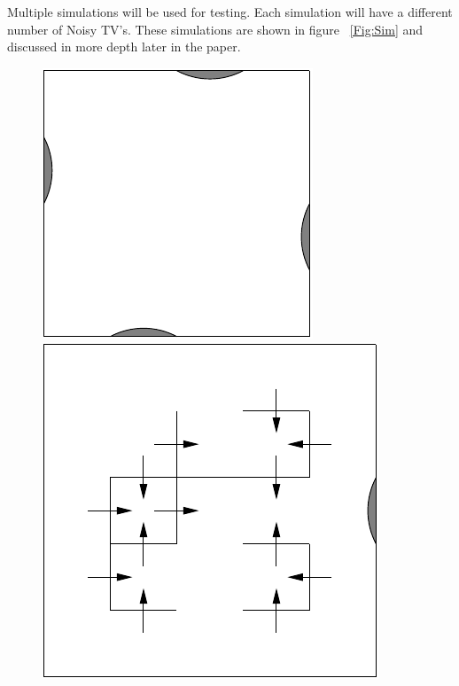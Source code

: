 \documentclass[12pt]{thesis}
\begin{document}
Multiple simulations will be used for testing. Each simulation will have a different number of Noisy TV's. These simulations are shown in figure 
\figurename~\ref{Fig:Sim} and discussed in more depth later in the paper.
\begin{figure}
	\begin{center}
	  \includegraphics[scale=0.75]{"images/4-TV.pdf"}
          \hspace{0.5in}
	  \includegraphics[scale=0.75]{"images/1-TV.pdf"}
          \hspace{0.5in}

\end{center}
\end{figure}
\end{document}
